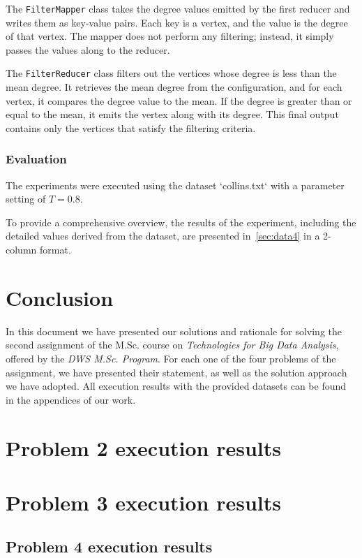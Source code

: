 \documentclass[acmlarge]{acmart}
\begin{document}
  The \texttt{FilterMapper} class takes the degree values emitted by the first reducer and writes them as key-value pairs.
  Each key is a vertex, and the value is the degree of that vertex.
  The mapper does not perform any filtering; instead, it simply passes the values along to the reducer.

  The \texttt{FilterReducer} class filters out the vertices whose degree is less than the mean degree.
  It retrieves the mean degree from the configuration, and for each vertex, it compares the degree value to the mean.
  If the degree is greater than or equal to the mean, it emits the vertex along with its degree.
  This final output contains only the vertices that satisfy the filtering criteria.

  \subsubsection{Evaluation}
  The experiments were executed using the dataset `collins.txt` with a parameter setting of \( T = 0.8 \).

  To provide a comprehensive overview, the results of the experiment, including the detailed values derived from the
  dataset, are presented in~\autoref{sec:data4} in a 2-column format.



  \section{Conclusion}
  \label{sec:conclusion}
  In this document we have presented our solutions and rationale for solving the second assignment of the M.Sc.
  course on \emph{Technologies for Big Data Analysis}, offered by the \emph{DWS M.Sc. Program}. For each one of the four problems of the assignment, we have presented their statement, as well as the solution approach we have adopted. All execution results with the provided datasets can be found in the appendices of our work.

  \newpage
  \appendix

  \section{Problem 2 execution results}
  \label{sec:data2}
  

  \section{Problem 3 execution results}
  \label{sec:data3}
  

  \subsection{Problem 4 execution results}
  \label{sec:data4}
  
\end{document}
